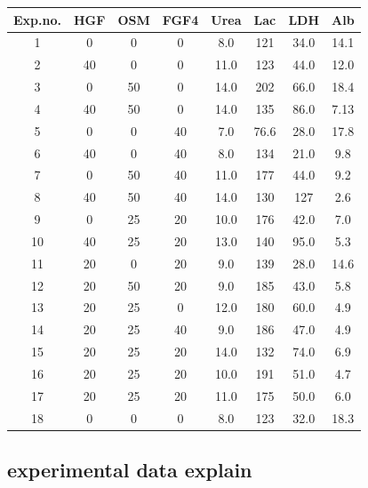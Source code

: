 \documentclass{article}
\begin{document}
\begin{center}
    \begin{tabular}{||c | c c c c | c c c||} 
     \hline
     Exp.no.&HGF&OSM&FGF4&Urea&Lac&LDH&Alb\\
     \hline\hline
1&0&0&0&8.0&121&34.0&14.1\\
2&40&0&0&11.0&123&44.0&12.0\\
3&0&50&0&14.0&202&66.0&18.4\\
4&40&50&0&14.0&135&86.0&7.13\\
5&0&0&40&7.0&76.6&28.0&17.8\\
6&40&0&40&8.0&134&21.0&9.8\\
7&0&50&40&11.0&177&44.0&9.2\\
8&40&50&40&14.0&130&127&2.6\\
9&0&25&20&10.0&176&42.0&7.0\\
10&40&25&20&13.0&140&95.0&5.3\\
11&20&0&20&9.0&139&28.0&14.6\\
12&20&50&20&9.0&185&43.0&5.8\\
13&20&25&0&12.0&180&60.0&4.9\\
14&20&25&40&9.0&186&47.0&4.9\\
15&20&25&20&14.0&132&74.0&6.9\\
16&20&25&20&10.0&191&51.0&4.7\\
17&20&25&20&11.0&175&50.0&6.0\\
18&0&0&0&8.0&123&32.0&18.3\\
     \hline
    \end{tabular}
\end{center}
\subsection{experimental data explain}
\end{document}
